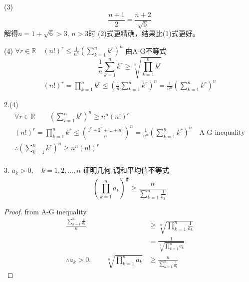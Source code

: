 (3) 
\begin{equation}
	\frac{n+1}{2} = \frac{n+2}{\sqrt{6}}
\end{equation}
解得$ n=1+\sqrt{6} >3 $, 
$ n>3 $时 (2)式更精确，结果比(1)式更好。

(4) $ \forall r \in \mathbb{R} \quad (n!)^r \leqslant \frac{1}{n^n}(\sum_{k=1}^n k^r)^n$
由A-G不等式
\begin{equation}
	\frac{1}{n}\sum_{k=1}^n k^r \ge \sqrt[n]{\prod_{k=1}^n k^r}
\end{equation}
\begin{equation}
	\begin{aligned}
		(n!)^r  = \prod_{k=1}^n k^r\leqslant (\frac{1}{n}\sum_{k=1}^n k^r)^n =\frac{1}{n^n}(\sum_{k=1}^n k^r)^n
	\end{aligned}
\end{equation}

\date{20.08.13}
2.(4) 
\begin{equation}
	\begin{aligned}
		\forall r \in \mathbb{R} \qquad (\sum_{i=1}^n k^r)^n \ge n^n(n!)^r \\
	 (n!)^r = \prod_{k=1}^n k^r \leqslant (\frac{1^r+2^r+\dots + n^r}{n})^n = \frac{1}{n^n}(\sum_{k=1}^n k^r)^n \quad \text{A-G inequality} \\
	 \therefore (\sum_{k=1}^n k^r)^n \ge n^n(n!)^r\\
	\end{aligned}
\end{equation}

3. $ a_k >0, \quad k=1,2,\dots, n $ 证明几何-调和平均值不等式
\begin{equation}
	(\prod_{k=1}^n a_k)^{\frac{1}{n}}\ge \frac{n}{\sum_{k=1}^n\frac{1}{a_k}}
\end{equation}	
\begin{proof}
	from A-G inequality 
	\begin{equation}
		\begin{aligned}
			\frac{\sum_{k=1}^n\frac{1}{a_k}}{n} &\ge \sqrt[n]{\prod_{k=1}^n \frac{1}{a_k}} \\
			& =  \frac{1}{\sqrt[n]{\prod_{k=1}^n{a_k}}}\\
			\therefore a_k>0, \qquad {\sqrt[n]{\prod_{k=1}^n{a_k}}}&\ge \frac{n}{\sum_{k=1}^n\frac{1}{a_k}}
		\end{aligned}
	\end{equation}
	
\end{proof}


